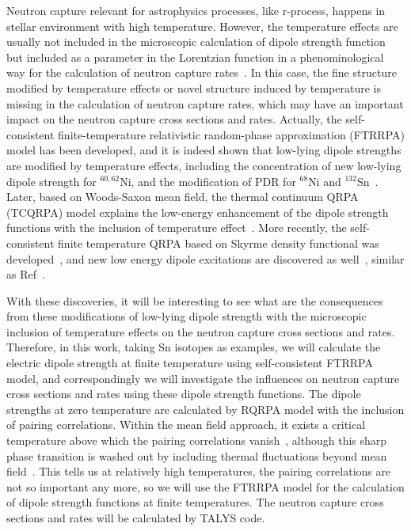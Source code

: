 \documentclass[prc,twocolumn,twoside,showpacs,superscriptaddress,floatfix]{revtex4-1}
\begin{document}
Neutron capture relevant for astrophysics processes, like r-process, happens in
stellar environment with high temperature.
However, the temperature effects are
usually not included in the microscopic calculation of dipole strength function
but included as a parameter in the Lorentzian function in a phenominological
way for the calculation of neutron capture rates~\cite{GorielyNPA2002,
GorielyPLB1998, Goriely2019}.
In this case, the fine structure modified by
temperature effects or novel structure induced by temperature is missing in the
calculation of neutron capture rates, which may have an important impact on the
neutron capture cross sections and rates.
Actually, the self-consistent
finite-temperature relativistic random-phase approximation (FTRRPA) model has
been developed, and it is indeed shown that low-lying dipole strengths are
modified by temperature effects, including the concentration of new low-lying
dipole strength for $^{60,62}$Ni, and the modification of PDR for $^{68}$Ni and
$^{132}$Sn~\cite{Niu_2009}.
Later, based on Woods-Saxon mean field, the thermal
continuum QRPA (TCQRPA) model explains the low-energy enhancement of the dipole
strength functions with the inclusion of temperature effect~\cite{Litvinova2013}.
More recently, the self-consistent finite temperature
QRPA based on Skyrme density functional was developed~\cite{Yuksel2017}, and
new low energy dipole excitations are discovered as well~\cite{Yuksel2017,
Yuksel2019}, similar as Ref~\cite{Niu_2009, Litvinova2013}.

With these discoveries, it will be interesting to see what are the consequences
from these modifications of low-lying dipole strength with the microscopic
inclusion of temperature effects on the neutron capture cross sections and
rates.
Therefore, in this work, taking Sn isotopes as examples, we will
calculate the electric dipole strength at finite temperature using
self-consistent FTRRPA model, and correspondingly we will investigate the
influences on neutron capture cross sections and rates using these dipole
strength functions.
The dipole strengths at zero temperature are calculated by
RQRPA model with the inclusion of pairing correlations.
Within the mean field
approach, it exists a critical temperature above which the pairing correlations
vanish~\cite{Niu2013, Yuksel}, although this sharp phase transition is washed
out by including thermal fluctuations beyond mean field~\cite{Gambarcuta}.
This
tells us at relatively high temperatures, the pairing correlations are not so
important any more, so we will use the FTRRPA model for the calculation of
dipole strength functions at finite temperatures.
The neutron capture cross
sections and rates will be calculated by TALYS code.
\end{document}
